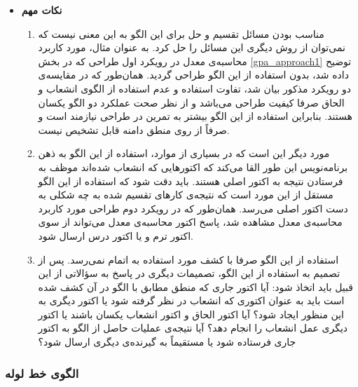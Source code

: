 \begin{itemize}
\item\textbf{نکات مهم}\\
\begin{enumerate}
\item مناسب بودن مسائل تقسیم و حل برای این الگو به این معنی نیست که نمی‌توان از روش دیگری این مسائل را حل کرد. به عنوان مثال، مورد کاربرد محاسبه‌ی معدل در رویکرد  اول طراحی که در بخش \ref{gpa_approach1} توضیح داده شد، بدون استفاده از این الگو طراحی گردید. همان‌طور که در مقایسه‌ی دو رویکرد مذکور بیان شد، تفاوت استفاده و عدم استفاده از الگوی انشعاب و الحاق صرفا کیفیت طراحی می‌باشد و از نظر صحت عملکرد دو الگو یکسان هستند. بنابراین استفاده از این الگو بیشتر به تمرین در طراحی نیازمند است و صرفاً از روی منطق دامنه قابل تشخیص نیست.
\item مورد دیگر این است که در بسیاری از موارد، استفاده از این الگو به ذهن برنامه‌نویس این طور القا می‌کند که اکتورهایی که انشعاب شده‌اند موظف به فرستادن نتیجه به اکتور اصلی هستند. باید دقت شود که استفاده از این الگو مستقل از این مورد است که نتیجه‌ی کارهای تقسیم شده به چه شکلی به دست اکتور اصلی می‌رسد. همان‌طور که در رویکرد دوم طراحی مورد کاربرد محاسبه‌ی معدل مشاهده شد، پاسخ اکتور محاسبه‌ی معدل می‌تواند از سوی اکتور ترم و یا اکتور درس ارسال شود.
\item استفاده از این الگو صرفا با کشف مورد استفاده به اتمام نمی‌رسد. پس از تصمیم به استفاده از این الگو، تصمیمات دیگری در پاسخ به سؤالاتی از این قبیل باید اتخاذ شود: آیا  اکتور جاری که منطق مطابق با الگو در آن کشف شده است باید به عنوان اکتوری که انشعاب در نظر گرفته شود یا اکتور دیگری به این منظور ایجاد شود؟ آیا اکتور الحاق و اکتور انشعاب یکسان باشند یا اکتور دیگری عمل انشعاب را انجام دهد؟ آیا نتیجه‌ی عملیات حاصل از الگو به اکتور جاری فرستاده شود یا مستقیماً به گیرنده‌ی دیگری ارسال شود؟ 
\end{enumerate} 

\end{itemize}

\subsubsection{الگوی خط لوله}

